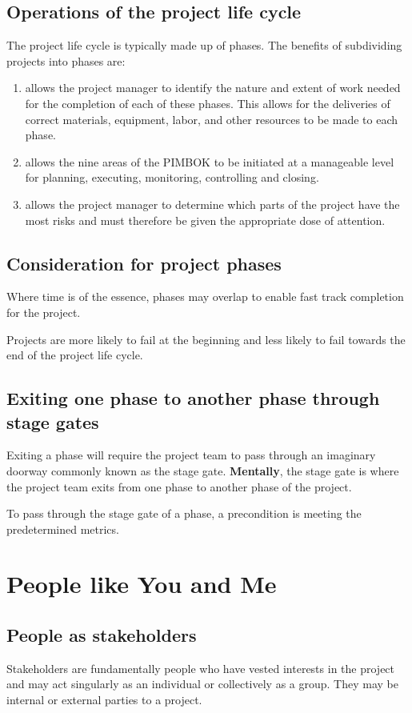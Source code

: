 \documentclass[math,code]{amznotes}
\theoremstyle{remark}
\begin{document}
\subsection{Operations of the project life cycle}
The project life cycle is typically made up of phases. The benefits of subdividing projects into phases are:
\begin{enumerate}
    \item allows the project manager to identify the nature and extent of work needed for the completion of each of these phases. This allows for the deliveries of correct materials, equipment, labor, and other resources to be made to each phase.
    \item allows the nine areas of the PIMBOK to be initiated at a manageable level for planning, executing, monitoring, controlling and closing.
    \item allows the project manager to determine which parts of the project have the most risks and must therefore be given the appropriate dose of attention.
\end{enumerate}

\subsection{Consideration for project phases}
Where time is of the essence, phases may overlap to enable fast track completion for the project.

Projects are more likely to fail at the beginning and less likely to fail towards the end of the project life cycle.

\subsection{Exiting one phase to another phase through stage gates}
Exiting a phase will require the project team to pass through an imaginary doorway commonly known as the stage gate. \textbf{Mentally}, the stage gate is where the project team exits from one phase to another phase of the project.

To pass through the stage gate of a phase, a precondition is meeting the predetermined metrics.

\section{People like You and Me}
\subsection{People as stakeholders}
Stakeholders are fundamentally people who have vested interests in the project and may act singularly as an individual or collectively as a group. They may be internal or external parties to a project.
\end{document}
